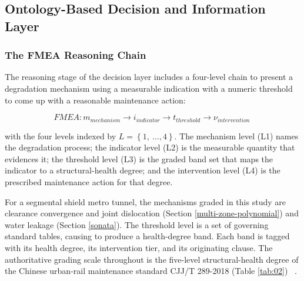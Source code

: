 \documentclass[preprint,12pt,authoryear]{elsarticle}
\begin{document}
\subsection{Ontology-Based Decision and Information
Layer}\label{ontology-based-decision-and-information-layer}

\subsubsection{The FMEA Reasoning Chain}\label{the-fmea-reasoning-chain}

The reasoning stage of the decision layer includes a four-level chain to
present a degradation mechanism using a measurable indication with a
numeric threshold to come up with a reasonable maintenance action:

\begin{equation}
  FMEA:m_{mechanism} \rightarrow i_{indicator} \rightarrow t_{threshold} \rightarrow \nu_{intervention}\
  \label{eq:26}
\end{equation}

with the four levels indexed by \(L = \left\{ 1,\ \ldots,4 \right\}\).
The mechanism level (L1) names the degradation process; the indicator
level (L2) is the measurable quantity that evidences it; the threshold
level (L3) is the graded band set that maps the indicator to a
structural-health degree; and the intervention level (L4) is the
prescribed maintenance action for that degree.

For a segmental shield metro tunnel, the mechanisms graded in this study
are clearance convergence and joint dislocation (Section \ref{multi-zone-polynomial}) and water
leakage (Section \ref{sonata}). The threshold level is a set of governing
standard tables, causing to produce a health-degree band. Each band is
tagged with its health degree, its intervention tier, and its
originating clause. The authoritative grading scale throughout is the
five-level structural-health degree of the Chinese urban-rail
maintenance standard CJJ/T 289-2018 (Table \ref{tab:02}) ~\citep{MOHURD2018}.
\end{document}

